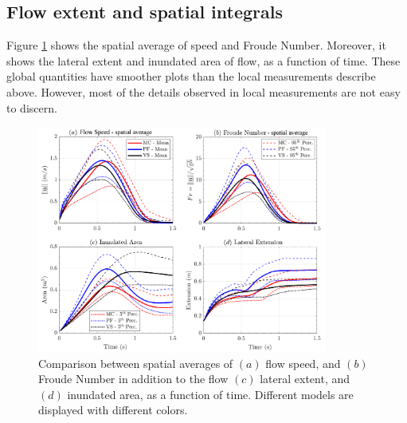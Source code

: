 \documentclass{article}
\begin{document}
\subsection{Flow extent and spatial integrals}
Figure \ref{fig:Ramp-spatial} shows the spatial average of speed and Froude Number. Moreover, it shows the lateral extent and inundated area of flow, as a function of time. These global quantities have smoother plots than the local measurements describe above. However, most of the details observed in local measurements are not easy to discern.
\begin{figure}[H]
        \centering
        \includegraphics[width=0.85\textwidth]{InclinedPlane/AveragedMeasurments/Averaged_MeasuresIncline.png}
        \caption{Comparison between spatial averages of $(a)$ flow speed, and $(b)$ Froude Number in addition to the flow $(c)$ lateral extent, and $(d)$ inundated area, as a function of time. Different models are displayed with different colors.}
        \label{fig:Ramp-spatial}
\end{figure}
\end{document}
